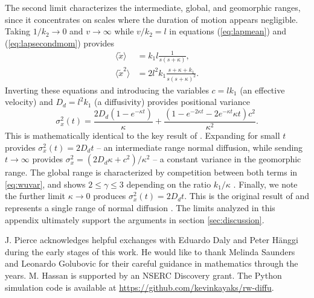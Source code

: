 \documentclass[]{agujournal2018}
\newcommand\be{\begin{equation}}
\newcommand\ee{\end{equation}}
\newcommand\bra{\langle}
\newcommand\ket{\rangle}
\begin{document}
The second limit characterizes the intermediate, global, and geomorphic ranges, since it concentrates on scales where the duration of motion appears negligible.
Taking $1/k_2 \rightarrow 0$ and $v\rightarrow \infty$ while $v/k_2 = l$ in  equations (\ref{eq:lapmean}) and (\ref{eq:lapsecondmom}) provides
\begin{align}
\bra \tilde{x} \ket &= k_1l\frac{1}{s(s+\kappa)},\\
\bra \tilde{x}^2 \ket &= 2l^2k_1 \frac{s+\kappa+k_1}{s(s+\kappa)^2}.
\end{align}
Inverting these equations and introducing the variables $c=lk_1$ (an effective velocity) and $D_d = l^2k_1$ (a diffusivity) provides positional variance
\be \sigma_x^2(t) = \frac{2D_d(1-e^{-\kappa t})}{\kappa} + \frac{(1-e^{-2\kappa t}-2e^{-\kappa t}\kappa t)c^2}{\kappa^2}. \label{eq:wuvar}\ee
This is mathematically identical to the key result of \citet{Wu2019}.
Expanding for small $t$ provides $\sigma_x^2(t) = 2D_d t$ -- an intermediate range normal diffusion, while sending $t\rightarrow \infty$ provides $\sigma_x^2 = (2D_d\kappa + c^2)/\kappa^2$ -- a constant variance in the geomorphic range.
The global range is characterized by competition between both terms in \ref{eq:wuvar}, and shows $2 \leq \gamma \leq 3$ depending on the ratio $k_1/\kappa$ \citep[cf.][]{Wu2019}.
Finally, we note the further limit $\kappa \rightarrow 0$ produces $\sigma_x^2(t) = 2D_d t$.
This is the original result of \citet{Einstein1937} and represents a single range of normal diffusion \citep[e.g.][]{Hubbell1964,Nakagawa1976}.
The limits analyzed in this appendix ultimately support the arguments in section \ref{sec:discussion}.

\acknowledgments
J. Pierce acknowledges helpful exchanges with Eduardo Daly and Peter H{\"a}nggi during the early stages of this work. He would like to thank Melinda Saunders and Leonardo Golubovic for their careful guidance in mathematics through the years. M. Hassan is supported by an NSERC Discovery grant. The Python simulation code is available at \sloppy
\url{https://github.com/kevinkayaks/rw-diffu}.


\end{document}
